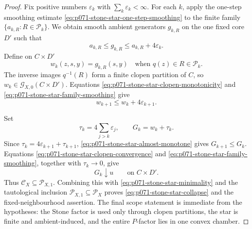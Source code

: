 \begin{proof}
Fix positive numbers \(\varepsilon_k\) with
\(\sum_k\varepsilon_k<\infty\).  For each \(k\), apply the one-step
smoothing estimate
\eqref{eq:p071-stone-star-one-step-smoothing} to the finite family
\(\{a_{k,R}:R\in\mathscr P_k\}\).  We obtain smooth ambient generators
\(g_{k,R}\) on the one fixed core \(D'\) such that
\begin{equation}
                 a_{k,R}\leq g_{k,R}
                    \leq a_{k,R}+4\varepsilon_k.
 \label{eq:p071-stone-star-family-smoothing}
\end{equation}
Define on \(C\times D'\)
\begin{equation}
 w_k(z,s,y)=g_{k,R}(s,y)
       \quad\text{when }q(z)\in R\in\mathscr P_k.
 \label{eq:p071-stone-star-piecewise-smoothing}
\end{equation}
The inverse images \(q^{-1}(R)\) form a finite clopen partition of \(C\),
so \(w_k\in\mathcal G_{X,0}(C\times D')\).  Equations
\eqref{eq:p071-stone-star-clopen-monotonicity} and
\eqref{eq:p071-stone-star-family-smoothing} give
\begin{equation}
                         w_{k+1}\leq w_k+4\varepsilon_{k+1}.
 \label{eq:p071-stone-star-almost-monotone}
\end{equation}

Set
\[
                    \tau_k=4\sum_{j>k}\varepsilon_j,
                    \qquad G_k=w_k+\tau_k.
\]
Since \(\tau_k=4\varepsilon_{k+1}+\tau_{k+1}\),
\eqref{eq:p071-stone-star-almost-monotone} gives
\(G_{k+1}\leq G_k\).  Equations
\eqref{eq:p071-stone-star-clopen-convergence} and
\eqref{eq:p071-stone-star-family-smoothing}, together with
\(\tau_k\to0\), give
\[
                              G_k\downarrow u
                              \qquad\text{on }C\times D'.
\]
Thus \(\mathcal C_X\subseteq\mathcal P_{X,1}\).  Combining this with
\eqref{eq:p071-stone-star-minimality} and the tautological inclusion
\(\mathcal P_{X,1}\subseteq\mathcal P_X\) proves
\eqref{eq:p071-stone-star-collapse} and the fixed-neighbourhood assertion.
The final scope statement is immediate from the hypotheses: the Stone
factor is used only through clopen partitions, the star is finite and
ambient-induced, and the entire \(P\)-factor lies in one convex chamber.
\end{proof}
